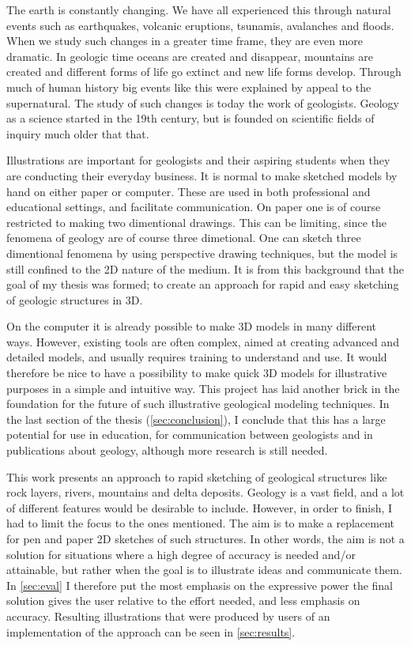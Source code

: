 \documentclass[a4paper,12pt]{report}
\newcommand{\secref}[1]{\autoref{#1}}
\begin{document}
The earth is constantly changing. We have all experienced this through natural events such as earthquakes, volcanic eruptions, tsunamis, avalanches and floods. When we study such changes in a greater time frame, they are even more dramatic. In geologic time oceans are created and disappear, mountains are created and different forms of life go extinct and new life forms develop. Through much of human history big events like this were explained by appeal to the supernatural. The study of such changes is today the work of geologists. Geology as a science started in the 19th century, but is founded on scientific fields of inquiry much older that that.

Illustrations are important for geologists and their aspiring students when they are conducting their everyday business. It is normal to make sketched models by hand on either paper or computer. These are used in both professional and educational settings, and facilitate communication. On paper one is of course restricted to making two dimentional drawings. This can be limiting, since the fenomena of geology are of course three dimetional. One can sketch three dimentional fenomena by using perspective drawing techniques, but the model is still confined to the 2D nature of the medium. It is from this background that the goal of my thesis was formed; to create an approach for rapid and easy sketching of geologic structures in 3D.

On the computer it is already possible to make 3D models in many different ways. However, existing tools are often complex, aimed at creating advanced and detailed models, and usually requires training to understand and use. It would therefore be nice to have a possibility to make quick 3D models for illustrative purposes in a simple and intuitive way. This project has laid another brick in the foundation for the future of such illustrative geological modeling techniques. In the last section of the thesis (\secref{sec:conclusion}), I conclude that this has a large potential for use in education, for communication between geologists and in publications about geology, although more research is still needed.

This work presents an approach to rapid sketching of geological structures like rock layers, rivers, mountains and delta deposits. Geology is a vast field, and a lot of different features would be desirable to include. However, in order to finish, I had to limit the focus to the ones mentioned. The aim is to make a replacement for pen and paper 2D sketches of such structures. In other words, the aim is not a solution for situations where a high degree of accuracy is needed and/or attainable, but rather when the goal is to illustrate ideas and communicate them. In \secref{sec:eval} I therefore put the most emphasis on the expressive power the final solution gives the user relative to the effort needed, and less emphasis on accuracy. Resulting illustrations that were produced by users of an implementation of the approach can be seen in \secref{sec:results}.
\end{document}
